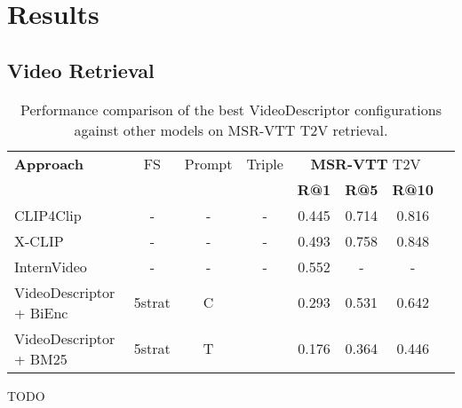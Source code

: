 \section{Results}

\subsection{Video Retrieval}

\begin{table}[htbp]
  \centering
  \begin{tabular}{lccccccc}
    \toprule
    \textbf{Approach} &FS & Prompt & Triple & \multicolumn{3}{c}{\textbf{MSR-VTT} T2V} \\
    \cmidrule(lr){5-7}
                      &&&& \textbf{R@1} & \textbf{R@5} & \textbf{R@10} \\
    \midrule
    CLIP4Clip \cite{clip4clip} &-&-&-& 0.445 & 0.714 &  0.816\\
    \midrule
    X-CLIP \cite{xclip} &-&-&-& 0.493 & 0.758 & 0.848 \\
    \midrule
    InternVideo \cite{internvideo} &-&-&-& 0.552 & - & - \\
    \bottomrule
    VideoDescriptor + BiEnc &5strat&C& & 0.293 & 0.531 & 0.642 \\
    \midrule
    VideoDescriptor + BM25 &5strat&T& & 0.176 & 0.364 & 0.446 \\
  \end{tabular}
  \caption{Performance comparison of the best VideoDescriptor configurations against other models on MSR-VTT T2V retrieval.}
  \label{tab:model_comparison}
\end{table}

TODO

